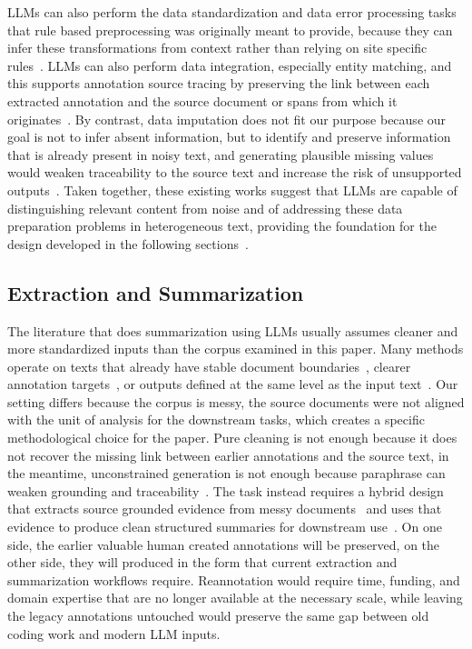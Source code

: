 \documentclass{article}
\begin{document}
LLMs can also perform the data standardization and data error processing tasks that rule based preprocessing was originally meant to provide, because they can infer these transformations from context rather than relying on site specific rules~\cite{Ma_etal2023,Zhang_etal2024,Choi_etal2024,Biester_etal2024,Li_etal2024,Yan_etal2024}. LLMs can also perform data integration, especially entity matching, and this supports annotation source tracing by preserving the link between each extracted annotation and the source document or spans from which it originates~\cite{Peeters_etal2025,Wang_etal2025,Fan_etal2024}. By contrast, data imputation does not fit our purpose because our goal is not to infer absent information, but to identify and preserve information that is already present in noisy text, and generating plausible missing values would weaken traceability to the source text and increase the risk of unsupported outputs~\cite{Ding_etal2024,He_etal2025}. Taken together, these existing works suggest that LLMs are capable of distinguishing relevant content from noise and of addressing these data preparation problems in heterogeneous text, providing the foundation for the design developed in the following sections~\cite{Zhou_etal2026}.

\subsection{Extraction and
Summarization}\label{extraction-and-summarization}

The literature that does summarization using LLMs usually assumes cleaner and more standardized inputs than the corpus examined in this paper. Many methods operate on texts that already have stable document boundaries~\cite{Choi_etal2024}, clearer annotation targets~\cite{Ma_etal2023}, or outputs defined at the same level as the input text~\cite{Zhang_etal2024}. Our setting differs because the corpus is messy, the source documents were not aligned with the unit of analysis for the downstream tasks, which creates a specific methodological choice for the paper. Pure cleaning is not enough because it does not recover the missing link between earlier annotations and the source text, in the meantime, unconstrained generation is not enough because paraphrase can weaken grounding and traceability~\cite{Brandt_etal2025}. The task instead requires a hybrid design that extracts source grounded evidence from messy documents~\cite{Dagdelen_etal2024} and uses that evidence to produce clean structured summaries for downstream use~\cite{olsen-etal-2024-socio}. On one side, the earlier valuable human created annotations will be preserved, on the other side, they will produced in the form that current extraction and summarization workflows require. Reannotation would require time, funding, and domain expertise that are no longer available at the necessary scale, while leaving the legacy annotations untouched would preserve the same gap between old coding work and modern LLM inputs.
\end{document}
